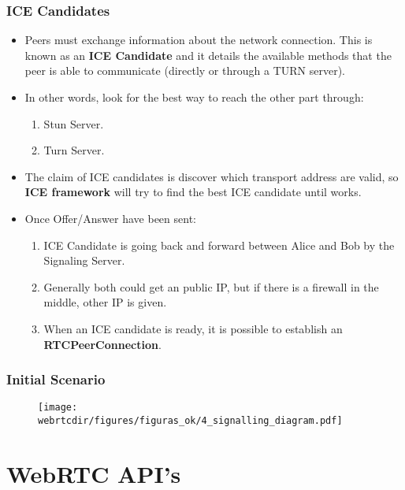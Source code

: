 \begin{frame}[fragile]\frametitle{ICE Candidates}
\begin{itemize}
\item Peers must exchange information about the network connection. This is
known as an \textbf{ICE Candidate} and it details the available methods that the peer is
able to communicate (directly or through a TURN server). 
\item In other words, look for the best way to reach the other part through:

  \begin{enumerate}
  \item Stun Server.
  \item Turn Server.
  \end{enumerate}

\item The claim of ICE candidates is discover which transport address are valid, so \textbf{ICE framework} will try to find the best ICE candidate until works.
\item Once Offer/Answer have been sent:
  \begin{enumerate}
  \item ICE Candidate is going back and forward between Alice and Bob by the
  Signaling Server.
  \item Generally both could get an public IP, but if there is a firewall in the middle,
  other IP is given.
  \item When an ICE candidate is ready, it is possible to establish an \textbf{RTCPeerConnection}.
  \end{enumerate}
  
\end{itemize}
\end{frame}

\begin{frame}[fragile]\frametitle{Initial Scenario}
\begin{figure}
\texttt{[image: \\webrtcdir/figures/figuras\_ok/4\_signalling\_diagram.pdf]}
\end{figure}
\end{frame}


\section{WebRTC API's}

